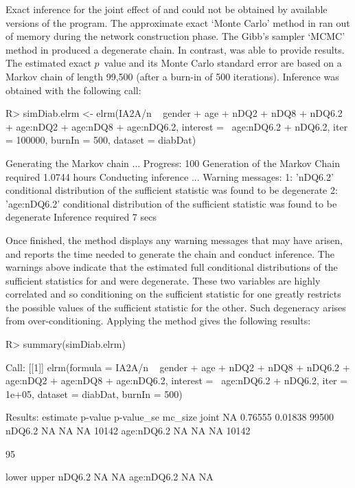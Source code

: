 \documentclass[article, shortnames]{jss}
\begin{document}
Exact inference for the joint effect of  and
 could not be obtained by available versions of
the  program. The approximate exact `Monte Carlo'
method in  ran out of memory during the network
construction phase. The Gibb's sampler `MCMC' method in
 produced a degenerate chain. In contrast, 
was able to provide results. The estimated exact $p$~value and its
Monte Carlo standard error are based on a Markov chain of length
99,500 (after a burn-in of 500 iterations). Inference was obtained
with the following call:
\begin{CodeChunk}
\begin{CodeInput}
R> simDiab.elrm <- elrm(IA2A/n ~ gender + age + nDQ2 + nDQ8 + nDQ6.2 +
age:nDQ2 + age:nDQ8 + age:nDQ6.2, interest = ~age:nDQ6.2 + nDQ6.2,
iter = 100000, burnIn = 500, dataset = diabDat)
\end{CodeInput}
\begin{CodeOutput}
Generating the Markov chain ...
Progress: 100%
Generation of the Markov Chain required 1.0744 hours
Conducting inference ...
Warning messages:
1: 'nDQ6.2' conditional distribution of the sufficient statistic was found to
be degenerate
2: 'age:nDQ6.2' conditional distribution of the sufficient statistic was found
to be degenerate
Inference required 7 secs
\end{CodeOutput}
\end{CodeChunk}
Once finished, the  method displays any warning
messages that may have arisen, and reports the time needed to
generate the chain and conduct inference. The warnings above
indicate that the estimated full conditional distributions of the
sufficient statistics for  and  were
degenerate. These two variables are highly correlated and so
conditioning on the sufficient statistic for one greatly restricts
the possible values of the sufficient statistic for the other.
Such degeneracy arises from over-conditioning. Applying the
 method gives the following results:
\begin{CodeChunk}
\begin{CodeInput}
R> summary(simDiab.elrm)
\end{CodeInput}
\begin{CodeOutput}
Call:
[[1]]
elrm(formula = IA2A/n ~ gender + age + nDQ2 + nDQ8 + nDQ6.2 +
    age:nDQ2 + age:nDQ8 + age:nDQ6.2, interest = ~age:nDQ6.2 +
    nDQ6.2, iter = 1e+05, dataset = diabDat, burnIn = 500)

Results:
           estimate p-value p-value_se mc_size
joint            NA 0.76555    0.01838   99500
nDQ6.2           NA      NA         NA   10142
age:nDQ6.2       NA      NA         NA   10142

95%

           lower upper
nDQ6.2        NA    NA
age:nDQ6.2    NA    NA
\end{CodeOutput}
\end{CodeChunk}
\end{document}
